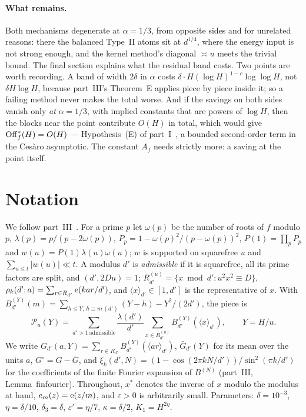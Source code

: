\documentclass[11pt,a4paper]{article}
\begin{document}
\paragraph{What remains.} Both mechanisms degenerate at $\alpha=1/3$, from opposite sides and for unrelated reasons: there the balanced Type~II atoms sit at $d^{1/4}$, where the
energy input is not strong enough, and the kernel method's diagonal $\asymp u$ meets the trivial bound. The final section explains what the residual band costs. Two points are
worth recording. A band of width $2\delta$ in $\alpha$ costs $\delta\cdot H(\log H)^{1-c}\log\log H$, not $\delta H\log H$, because part~III's Theorem~E applies piece by piece
inside it; so a failing method never makes the total worse. And if the savings on both sides vanish only \emph{at} $\alpha=1/3$, with implied constants that are powers of
$\log H$, then the blocks near the point contribute $O(H)$ in total, which would give $\mathrm{Off}^\ast_f(H)=O(H)$ --- Hypothesis~(E) of part~I~\cite{ReichardtI}, a bounded
second-order term in the Ces\`aro asymptotic. The constant $A_f$ needs strictly more: a saving at the point itself.

\section{Notation}
We follow part~III~\cite{ReichardtIII}. For a prime $p$ let $\omega(p)$ be the number of roots of $f$ modulo $p$, $\lambda(p)=p/(p-2\omega(p))$, $P_p=1-\omega(p)^2/(p-\omega(p))^2$,
$P(1)=\prod_pP_p$ and $w(u)=P(1)\lambda(u)\omega(u)$; $w$ is supported on squarefree $u$ and $\sum_{u\le t}|w(u)|\ll t$. A modulus $d'$ is \emph{admissible} if it is squarefree,
all its prime factors are split, and $(d',2Du)=1$; $R^{(u)}_{d'}=\{x\bmod d':u^2x^2\equiv D\}$, $\rho_k(d';a)=\sum_{r\in R_{d'}}\mathrm{e}(kar/d')$, and $\langle x\rangle_{d'}\in[1,d']$ is
the representative of $x$. With $B^{(Y)}_{d'}(m)=\sum_{h\le Y,\,h\equiv m\,(d')}(Y-h)-Y^2/(2d')$, the piece is
\[
\mathcal P_u(Y)=\sum_{d'>1\ \mathrm{admissible}}\frac{\lambda(d')}{d'}\sum_{x\in R^{(u)}_{d'}}B^{(Y)}_{d'}(\langle x\rangle_{d'}),\qquad Y=H/u .
\]
We write $G_{d'}(a,Y)=\sum_{r\in R_{d'}}B^{(Y)}_{d'}(\langle ar\rangle_{d'})$, $\bar G_{d'}(Y)$ for its mean over the units $a$, $G^\circ=G-\bar G$, and $\xi_k(d',N)=(1-\cos(2\pi
kN/d'))/\sin^2(\pi k/d')$ for the coefficients of the finite Fourier expansion of $B^{(N)}$ (part~III, Lemma~finfourier). Throughout, $x^\ast$ denotes the inverse of $x$ modulo the
modulus at hand, $e_m(z)=\mathrm{e}(z/m)$, and $\varepsilon>0$ is arbitrarily small. Parameters: $\delta=10^{-3}$, $\eta=\delta/10$, $\delta_3=\delta$, $\varepsilon'=\eta/7$,
$\kappa=\delta/2$, $K_1=H^{2\eta}$.
\end{document}
